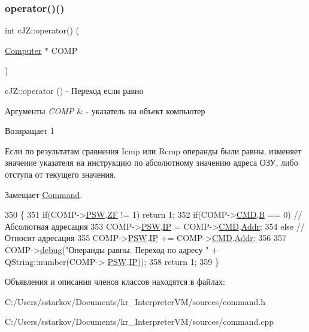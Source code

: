 \subsubsection{\texorpdfstring{operator()()}{operator()()}}
{\footnotesize\ttfamily int c\+J\+Z\+::operator() (\begin{DoxyParamCaption}\item[{\hyperlink{class_computer}{Computer} $\ast$}]{C\+O\+MP }\end{DoxyParamCaption})\hspace{0.3cm}{\ttfamily [virtual]}}



c\+J\+Z\+::operator () -\/ Переход если равно 


\begin{DoxyParams}{Аргументы}
{\em C\+O\+MP} & -\/ указатель на объект компьютер \\
\hline
\end{DoxyParams}
\begin{DoxyReturn}{Возвращает}
1
\end{DoxyReturn}
Если по результатам сравнения Icmp или Rcmp операнды были равны, изменяет значение указателя на инструкцию по абсолютному значению адреса ОЗУ, либо отступа от текущего значения. 

Замещает \hyperlink{class_command_a79939b66f3de892e91d7710844294716}{Command}.


\begin{DoxyCode}
350 \{
351     \textcolor{keywordflow}{if}(COMP->\hyperlink{class_computer_aada011a29d87bb979835371a5f09805e}{PSW}.\hyperlink{struct_computer_1_1bits_a5307edeadd212f1fc19e9f6f5346df39}{ZF} != 1) \textcolor{keywordflow}{return} 1;
352     \textcolor{keywordflow}{if}(COMP->\hyperlink{class_computer_a8423168f7cc356b4dd36977603798caf}{CMD}.\hyperlink{struct_computer_1_1command_a3e0d1e527de9f60594023a362b08a7de}{B} == 0) \textcolor{comment}{//Абсолютная адресация}
353         COMP->\hyperlink{class_computer_aada011a29d87bb979835371a5f09805e}{PSW}.\hyperlink{struct_computer_1_1bits_a7781883b446209714ad687e2a4f77526}{IP} = COMP->\hyperlink{class_computer_a8423168f7cc356b4dd36977603798caf}{CMD}.\hyperlink{struct_computer_1_1command_a0e07591012953413797506f7bc3cb1a7}{Addr};
354     \textcolor{keywordflow}{else} \textcolor{comment}{//Относит адресация}
355         COMP->\hyperlink{class_computer_aada011a29d87bb979835371a5f09805e}{PSW}.\hyperlink{struct_computer_1_1bits_a7781883b446209714ad687e2a4f77526}{IP} += COMP->\hyperlink{class_computer_a8423168f7cc356b4dd36977603798caf}{CMD}.\hyperlink{struct_computer_1_1command_a0e07591012953413797506f7bc3cb1a7}{Addr};
356 
357     COMP->\hyperlink{class_computer_a10ca6c6b200630119201de16d7368e0f}{debug}(\textcolor{stringliteral}{"Операнды равны. Переход по адресу "} + QString::number(COMP->
      \hyperlink{class_computer_aada011a29d87bb979835371a5f09805e}{PSW}.\hyperlink{struct_computer_1_1bits_a7781883b446209714ad687e2a4f77526}{IP}));
358     \textcolor{keywordflow}{return} 1;
359 \}
\end{DoxyCode}


Объявления и описания членов классов находятся в файлах\+:\begin{DoxyCompactItemize}
\item 
C\+:/\+Users/sstarkov/\+Documents/kr\+\_\+\+Interpreter\+V\+M/sources/command.\+h\item 
C\+:/\+Users/sstarkov/\+Documents/kr\+\_\+\+Interpreter\+V\+M/sources/command.\+cpp\end{DoxyCompactItemize}
